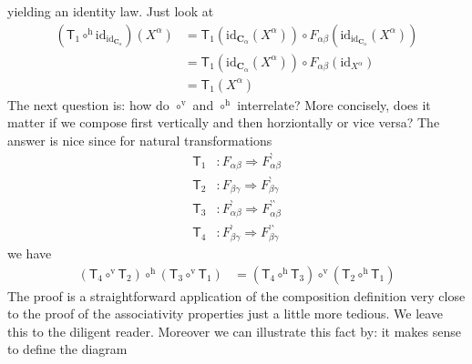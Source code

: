 yielding an identity law. Just look at
\begin{align*}
  \left(
    \mathsf{T}_{1}
    \circ^{\textrm{h}}
    \mathrm{id}_{\mathrm{id}_{\mathbf{C}_{\alpha}}}
  \right)
  (X^{\alpha})
  &=
  \mathsf{T}_{1}
  \left(
    \mathrm{id}_{\mathbf{C}_{\alpha}}(X^{\alpha})
  \right)
  \circ
  F_{\alpha\beta}
  \left(
    \mathrm{id}_{\mathrm{id}_{\mathbf{C}_{\alpha}}}(X^{\alpha})
  \right)
  \\
  &=
  \mathsf{T}_{1}
  \left(
    \mathrm{id}_{\mathbf{C}_{\alpha}}(X^{\alpha})
  \right)
  \circ
  F_{\alpha\beta}
  \left(
    \mathrm{id}_{X^{\alpha}}
  \right)
  \\
  &=
  \mathsf{T}_{1}(X^{\alpha})
\end{align*}
The next question is: how do $\circ^{\textrm{v}}$ and $\circ^{\textrm{h}}$ interrelate? More concisely, does it matter if we compose first vertically and then horziontally or vice versa? The answer is nice since for natural transformations
\begin{align*}
  \mathsf{T}_{1}
  &\colon
  F_{\alpha\beta}
  \Rightarrow
  F_{\alpha\beta}^{\backprime}
  \\
  \mathsf{T}_{2}
  &\colon
  F_{\beta\gamma}
  \Rightarrow
  F_{\beta\gamma}^{\backprime}
  \\
  \mathsf{T}_{3}
  &\colon
  F_{\alpha\beta}^{\backprime}
  \Rightarrow
  F_{\alpha\beta}^{\backprime\backprime}
  \\
  \mathsf{T}_{4}
  &\colon
  F_{\beta\gamma}^{\backprime}
  \Rightarrow
  F_{\beta\gamma}^{\backprime\backprime}
\end{align*}
we have
\begin{align*}
  \left(
    \mathsf{T}_{4}
    \circ^{\textrm{v}}
    \mathsf{T}_{2}
  \right)
  \circ^{\textrm{h}}
  \left(
    \mathsf{T}_{3}
    \circ^{\textrm{v}}
    \mathsf{T}_{1}
  \right)
  &=
  \left(
    \mathsf{T}_{4}
    \circ^{\textrm{h}}
    \mathsf{T}_{3}
  \right)
  \circ^{\textrm{v}}
  \left(
    \mathsf{T}_{2}
    \circ^{\textrm{h}}
    \mathsf{T}_{1}
  \right)
\end{align*}
The proof is a straightforward application of the composition definition very close to the proof of the associativity properties just a little more tedious. We leave this to the diligent reader. Moreover we can illustrate this fact by: it makes sense to define the diagram
